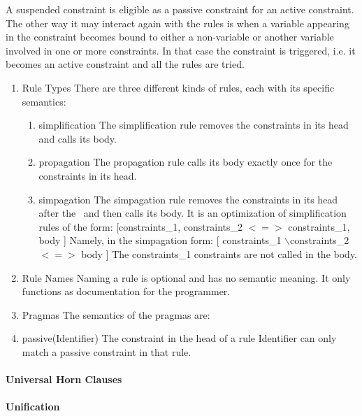 \documentclass[thesis-solanki.tex]{subfiles}
\begin{document}
A suspended constraint is eligible as a passive constraint for an active constraint. The other way it may interact again with the rules is when a variable appearing in the constraint becomes bound to either a non-variable or another variable involved in one or more constraints. In that case the constraint is triggered, i.e. it becomes an active constraint and all the rules are tried.
\begin{enumerate}

\item Rule Types There are three different kinds of rules, each with its specific semantics:
\begin{enumerate}

\item simplification
The simplification rule removes the constraints in its head and calls its body.

\item propagation
The propagation rule calls its body exactly once for the constraints in its head.

\item simpagation
The simpagation rule removes the constraints in its head after the \ and then calls its body. It is an optimization of simplification rules 
of the form: [constraints\_1, constraints\_2 $<=>$ constraints\_1, body ] Namely, in the simpagation form: [ constraints\_1 
$\backslash$constraints\_2 $<=>$ body ] The constraints\_1 constraints are not called in the body.

\end{enumerate}


\item Rule Names Naming a rule is optional and has no semantic meaning. It only functions as documentation for the programmer.

\item Pragmas The semantics of the pragmas are:

\item passive(Identifier)
The constraint in the head of a rule Identifier can only match a passive constraint in that rule. 

\end{enumerate}

\paragraph{Universal Horn Clauses}


\paragraph{Unification}
\end{document}
